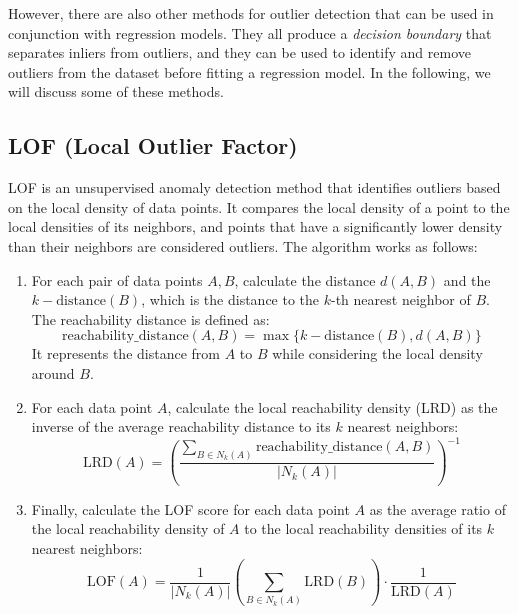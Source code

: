 However, there are also other methods for outlier detection that can be used in conjunction with regression models. They all produce a \emph{decision boundary} that separates inliers from outliers, and they can be used to identify and remove outliers from the dataset before fitting a regression model. In the following, we will discuss some of these methods.
\subsection{LOF (Local Outlier Factor)}

LOF is an unsupervised anomaly detection method that identifies outliers based on the local density of data points. It compares the local density of a point to the local densities of its neighbors, and points that have a significantly lower density than their neighbors are considered outliers. The algorithm works as follows:
\begin{enumerate}
    \item For each pair of data points $A, B$, calculate the distance $d(A, B)$ and the $k-\text{distance}(B)$, which is the distance to the $k$-th nearest neighbor of $B$. The reachability distance is defined as:
    \begin{equation*}
        \text{reachability\_distance}(A, B) = \max\{k-\text{distance}(B), d(A, B)\}
    \end{equation*}
    It represents the distance from $A$ to $B$ while considering the local density around $B$.

    \item For each data point $A$, calculate the local reachability density (LRD) as the inverse of the average reachability distance to its $k$ nearest neighbors:
    \begin{equation*}
        \text{LRD}(A) = \left( \frac{\sum\limits_{B \in N_k(A)} \text{reachability\_distance}(A, B)}{|N_k(A)|} \right)^{-1}
    \end{equation*}

    \item Finally, calculate the LOF score for each data point $A$ as the average ratio of the local reachability density of $A$ to the local reachability densities of its $k$ nearest neighbors:
    \begin{equation*}
        \text{LOF}(A) = \frac{1}{|N_k(A)|} \left( \sum_{B \in N_k(A)} \text{LRD}(B)\right) \cdot \dfrac{1}{\text{LRD}(A)}
    \end{equation*}
\end{enumerate}

